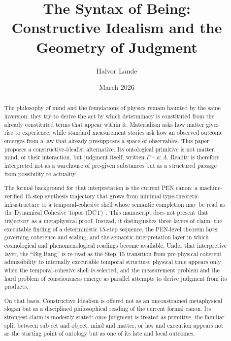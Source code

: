 \documentclass[11pt,a4paper]{article}
\title{\textbf{The Syntax of Being:\\
Constructive Idealism and the Geometry of Judgment}}
\author{Halvor Lande}
\date{March 2026}
\theoremstyle{plain}
\theoremstyle{definition}
\theoremstyle{remark}
\begin{document}
\maketitle

\begin{abstract}
The philosophy of mind and the foundations of physics remain haunted by the same inversion: they try to derive the act by which determinacy is constituted from the already constituted terms that appear within it.
Materialism asks how matter gives rise to experience, while standard measurement stories ask how an observed outcome emerges from a law that already presupposes a space of observables.
This paper proposes a constructive-idealist alternative.
Its ontological primitive is not matter, mind, or their interaction, but judgment itself, written $\Gamma \vdash a : A$.
Reality is therefore interpreted not as a warehouse of pre-given substances but as a structured passage from possibility to actuality.

The formal background for that interpretation is the current PEN canon: a machine-verified 15-step synthesis trajectory that grows from minimal type-theoretic infrastructure to a temporal-cohesive shell whose semantic completion may be read as the Dynamical Cohesive Topos (DCT)~\cite{pen,abb}.
This manuscript does not present that trajectory as a metaphysical proof.
Instead, it distinguishes three layers of claim: the executable finding of a deterministic 15-step sequence, the PEN-level theorem layer governing coherence and scaling, and the semantic interpretation layer in which cosmological and phenomenological readings become available.
Under that interpretive layer, the ``Big Bang'' is re-read as the Step~15 transition from pre-physical coherent admissibility to internally executable temporal structure, physical time appears only when the temporal-cohesive shell is selected, and the measurement problem and the hard problem of consciousness emerge as parallel attempts to derive judgment from its products.

On that basis, Constructive Idealism is offered not as an unconstrained metaphysical slogan but as a disciplined philosophical reading of the current formal canon.
Its strongest claim is modestly stated: once judgment is treated as primitive, the familiar split between subject and object, mind and matter, or law and execution appears not as the starting point of ontology but as one of its late and local outcomes.
\end{abstract}

\tableofcontents
\clearpage
\end{document}
